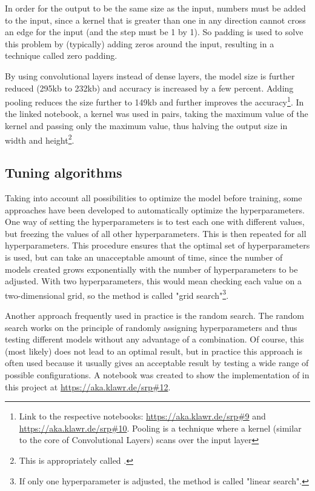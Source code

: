In order for the output to be the same size as the input, numbers must be added to the input, since a kernel that is greater than one in any direction cannot cross an edge for the input (and the step must be 1 by 1).
So padding is used to solve this problem by (typically) adding zeros around the input, resulting in a technique called zero padding.

By using convolutional layers instead of dense layers, the model size is further reduced (295kb to 232kb) and accuracy is increased by a few percent. Adding pooling reduces the size further to 149kb and further improves the accuracy\footnote{Link to the respective notebooks: \url{https://aka.klawr.de/srp\#9} and \url{https://aka.klawr.de/srp\#10}.
Pooling is a technique where a kernel (similar to the core of Convolutional Layers) scans over the input layer}.
In the linked notebook, a kernel was used in pairs, taking the maximum value of the kernel and passing only the maximum value, thus halving the output size in width and height\footnote{This is appropriately called .}.

\subsection{Tuning algorithms}

Taking into account all possibilities to optimize the model before training, some approaches have been developed to automatically optimize the hyperparameters.
One way of setting the hyperparameters is to test each one with different values, but freezing the values of all other hyperparameters.
This is then repeated for all hyperparameters.
This procedure ensures that the optimal set of hyperparameters is used, but can take an unacceptable amount of time, since the number of models created grows exponentially with the number of hyperparameters to be adjusted.
With two hyperparameters, this would mean checking each value on a two-dimensional grid, so the method is called "grid search"\footnote{If only one hyperparameter is adjusted, the method is called "linear search".}.

Another approach frequently used in practice is the random search.
The random search works on the principle of randomly assigning hyperparameters and thus testing different models without any advantage of a combination.
Of course, this (most likely) does not lead to an optimal result, but in practice this approach is often used because it usually gives an acceptable result by testing a wide range of possible configurations.
A notebook was created to show the implementation of  in this project at \url{https://aka.klawr.de/srp\#12}.

